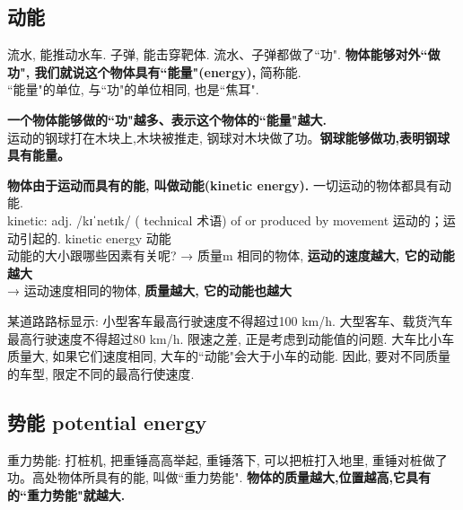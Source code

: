 \documentclass[UTF8]{ctexart}
\begin{document}
	\vspace{1em} 
	

	
	\subsection{动能}
	
	流水, 能推动水车. 子弹, 能击穿靶体. 流水、子弹都做了``功".  \textbf{物体能够对外``做功", 我们就说这个物体具有``能量"(energy), }简称能. \\
	``能量"的单位, 与``功"的单位相同, 也是``焦耳".
	
	\textbf{一个物体能够做的``功"越多、表示这个物体的``能量"越大.} \\
	
	运动的钢球打在木块上,木块被推走, 钢球对木块做了功。\textbf{钢球能够做功,表明钢球具有能量。}
	
	\textbf{物体由于运动而具有的能, 叫做动能(kinetic energy).} 一切运动的物体都具有动能. \\
	
	kinetic: adj.  /kɪˈnetɪk/  ( technical 术语) of or produced by movement 运动的；运动引起的. kinetic energy 动能 \\
	
	
	动能的大小跟哪些因素有关呢?
	→ 质量m 相同的物体, \textbf{运动的速度越大, 它的动能越大} \\
	→ 运动速度相同的物体, \textbf{质量越大, 它的动能也越大} \\
	
	
\begin{tcolorbox}[title = {例},boxrule={0.1em},colframe={black!10}, colback={black!3},colbacktitle={black!10},coltitle={black}]
某道路路标显示: 小型客车最高行驶速度不得超过100 km/h. 大型客车、载货汽车最高行驶速度不得超过80 km/h. 限速之差, 正是考虑到动能值的问题.  大车比小车质量大, 如果它们速度相同, 大车的``动能"会大于小车的动能. 因此, 要对不同质量的车型, 限定不同的最高行使速度.
\end{tcolorbox}
	
	\vspace{1em} 
	
	
	\subsection{势能 potential energy}
	
	重力势能: 打桩机, 把重锤高高举起, 重锤落下, 可以把桩打入地里, 重锤对桩做了功。高处物体所具有的能, 叫做``重力势能". \textbf{物体的质量越大,位置越高,它具有的``重力势能"就越大.	} \\
	
\end{document}

